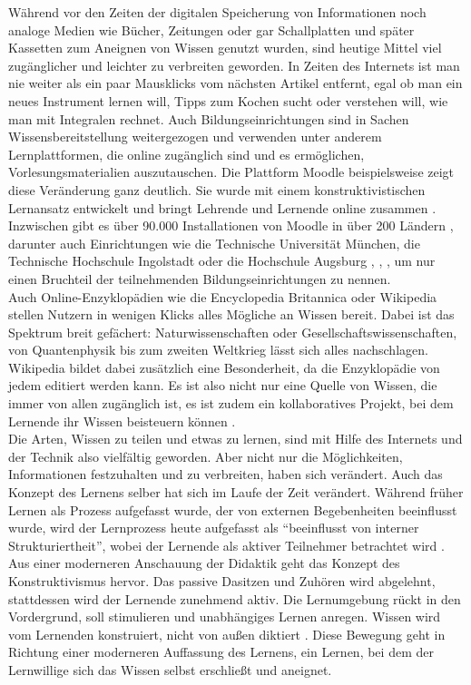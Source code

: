 \documentclass[12pt, a4paper]{article}
\begin{document}
Während vor den Zeiten der digitalen Speicherung von Informationen noch analoge Medien wie Bücher, Zeitungen oder gar Schallplatten und später Kassetten zum Aneignen von Wissen genutzt wurden, sind heutige Mittel viel zugänglicher und leichter zu verbreiten geworden. In Zeiten des Internets ist man nie weiter als ein paar Mausklicks vom nächsten Artikel entfernt, egal ob man ein neues Instrument lernen will, Tipps zum Kochen sucht oder verstehen will, wie man mit Integralen rechnet. Auch Bildungseinrichtungen sind in Sachen Wissensbereitstellung weitergezogen und verwenden unter anderem Lernplattformen, die online zugänglich sind und es ermöglichen, Vorlesungsmaterialien auszutauschen. Die Plattform Moodle beispielsweise zeigt diese Veränderung ganz deutlich. Sie wurde mit einem konstruktivistischen Lernansatz entwickelt und bringt Lehrende und Lernende online zusammen \cite{Moodle:01}. Inzwischen gibt es über 90.000 Installationen von Moodle in über 200 Ländern \cite{Moodle:02}, darunter auch Einrichtungen wie die Technische Universität München, die Technische Hochschule Ingolstadt oder die Hochschule Augsburg \cite{moodleAugsburg:01}, \cite{moodleTUM:01}, \cite{moodleIngolstadt:01}, um nur einen Bruchteil der teilnehmenden Bildungseinrichtungen zu nennen.\\

Auch Online-Enzyklopädien wie die Encyclopedia Britannica oder Wikipedia stellen Nutzern in wenigen Klicks alles Mögliche an Wissen bereit. Dabei ist das Spektrum breit gefächert: Naturwissenschaften oder Gesellschaftswissenschaften, von Quantenphysik bis zum zweiten Weltkrieg lässt sich alles nachschlagen. Wikipedia bildet dabei zusätzlich eine Besonderheit, da die Enzyklopädie von jedem editiert werden kann. Es ist also nicht nur eine Quelle von Wissen, die immer von allen zugänglich ist, es ist zudem ein kollaboratives Projekt, bei dem Lernende ihr Wissen beisteuern können \cite{Wiki:01}\cite[S.~1]{okoli2009brief}.\\

Die Arten, Wissen zu teilen und etwas zu lernen, sind mit Hilfe des Internets und der Technik also vielfältig geworden. Aber nicht nur die Möglichkeiten, Informationen festzuhalten und zu verbreiten, haben sich verändert. Auch das Konzept des Lernens selber hat sich im Laufe der Zeit verändert. Während früher Lernen als Prozess aufgefasst wurde, der von externen Begebenheiten beeinflusst wurde, wird der Lernprozess heute aufgefasst als "`beeinflusst von interner Strukturiertheit"', wobei der Lernende als aktiver Teilnehmer betrachtet wird \cite[S.~31]{terhart2003constructivism}. Aus einer moderneren Anschauung der Didaktik geht das Konzept des Konstruktivismus hervor. Das passive Dasitzen und Zuhören wird abgelehnt, stattdessen wird der Lernende zunehmend aktiv. Die Lernumgebung rückt in den Vordergrund, soll stimulieren und unabhängiges Lernen anregen. Wissen wird vom Lernenden konstruiert, nicht von außen diktiert \cite[S.~32]{terhart2003constructivism}. Diese Bewegung geht in Richtung einer moderneren Auffassung des Lernens, ein Lernen, bei dem der Lernwillige sich das Wissen selbst erschließt und aneignet.\\
\end{document}
